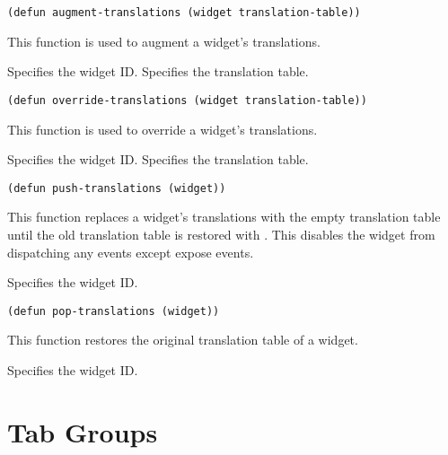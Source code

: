 \begin{lispd}
\syntax\begin{verbatim}
(defun augment-translations (widget translation-table))
\end{verbatim}
\beschr This function is used to augment a widget's translations.
\parameter
\begin{paramd}
 Specifies the widget ID.
 Specifies the translation table.
\end{paramd}
\end{lispd}

\begin{lispd}
\syntax\begin{verbatim}
(defun override-translations (widget translation-table))
\end{verbatim}
\beschr This function is used to override a widget's translations.
\parameter
\begin{paramd}
 Specifies the widget ID.
 Specifies the translation table.
\end{paramd}
\end{lispd}

\begin{lispd}
\syntax\begin{verbatim}
(defun push-translations (widget))
\end{verbatim}
\beschr This function replaces a widget's translations with the empty
translation table until the old translation table is restored with
. This disables the widget from dispatching any events
except expose events.
\parameter
\begin{paramd}
 Specifies the widget ID.
\end{paramd}
\end{lispd}

\begin{lispd}
\syntax\begin{verbatim}
(defun pop-translations (widget))
\end{verbatim}
\beschr This function restores the original translation table of a widget.
\parameter
\begin{paramd}
 Specifies the widget ID.
\end{paramd}
\end{lispd}

\chapter{Tab Groups}

